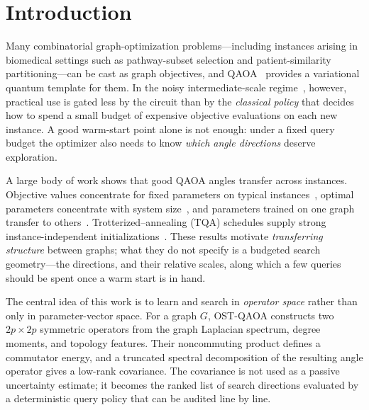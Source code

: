 \documentclass[aps,prresearch,reprint,amsmath,amssymb,floatfix,nofootinbib,superscriptaddress,longbibliography]{revtex4-2}
\theoremstyle{remark}
\newcommand{\QAOA}{\textnormal{\textsc{QAOA}}}
\newcommand{\OSTQAOA}{\textnormal{\textsc{OST-QAOA}}}
\newcommand{\TQA}{\textnormal{\textsc{TQA}}}
\begin{document}
\maketitle

\section{Introduction}

Many combinatorial graph-optimization problems---including instances arising in
biomedical settings such as pathway-subset selection and patient-similarity
partitioning---can be cast as graph objectives, and \QAOA{}~\cite{farhi2014}
provides a variational quantum template for them.  In the noisy intermediate-scale
regime~\cite{preskill2018}, however, practical use is gated less by the circuit
than by the \emph{classical policy} that decides how to spend a small budget of
expensive objective evaluations on each new instance.  A good warm-start point
alone is not enough: under a fixed query budget the optimizer also needs to know
\emph{which angle directions} deserve exploration.

A large body of work shows that good QAOA angles transfer across instances.
Objective values concentrate for fixed parameters on typical
instances~\cite{brandao2018,zhou2020}, optimal parameters concentrate with system
size~\cite{akshay2021}, and parameters trained on one graph transfer to
others~\cite{galda2021,shaydulin2023transfer}.  Trotterized--annealing (\TQA{})
schedules supply strong instance-independent initializations~\cite{sack2021}.
These results motivate \emph{transferring structure} between graphs; what they do
not specify is a budgeted search geometry---the directions, and their relative
scales, along which a few queries should be spent once a warm start is in hand.

The central idea of this work is to learn and search in \emph{operator space}
rather than only in parameter-vector space.  For a graph \(G\), \OSTQAOA{}
constructs two \(2p\times2p\) symmetric operators from the graph Laplacian
spectrum, degree moments, and topology features.  Their noncommuting product
defines a commutator energy, and a truncated spectral decomposition of the
resulting angle operator gives a low-rank covariance.  The covariance is not used
as a passive uncertainty estimate; it becomes the ranked list of search
directions evaluated by a deterministic query policy that can be audited line by
line.
\end{document}
